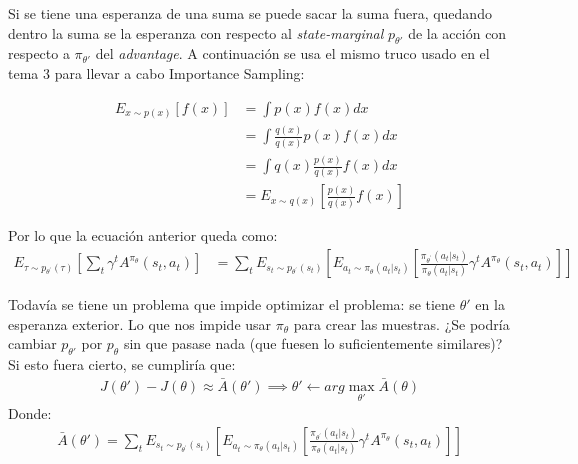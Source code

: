 Si se tiene una esperanza de una suma se puede sacar la suma fuera, quedando dentro la suma se la
esperanza con respecto al \textit{state-marginal} $p_{\theta'}$ de la acción con respecto a
$\pi_{\theta'}$ del \textit{advantage}. A continuación se usa el mismo truco usado en el tema 3
para llevar a cabo Importance Sampling:

\begin{align*}
    E_{x\sim p (x)}[f(x)] &= \int p(x)f(x)dx\\
                          &=\int \frac{q(x)}{q(x)} p(x)f(x)dx\\
                          &=\int q(x) \frac{p(x)}{q(x)} f(x)dx\\
                          &=E_{x\sim q(x)}\left[ \frac{p(x)}{q(x)} f(x)\right]
\end{align*}

Por lo que la ecuación anterior queda como:
\begin{align}
E _ { \tau \sim p _ { \theta ^ { \prime } } ( \tau ) } \left[ \sum _ { t } \gamma ^ { t } A ^ {
    \pi _ { \theta } } ( s _ { t } , a _ { t } ) \right] 
&= \sum _ { t } E _ { s _ { t } \sim p _ { \theta ^ { \prime } } ( s _ { t } ) } \left[ E _ { a _
    { t } \sim \pi _ { \theta } ( a _ { t } | s _ { t } ) } \left[ \frac { \pi _ { \theta ^ {
    \prime } } ( a _ { t } | s _ { t } ) } { \pi _ { \theta } ( a _ { t } | s _ { t } ) } \gamma
    ^ { t } A ^ { \pi _ { \theta } } ( s _ { t } , a _ { t } ) \right] \right]
\end{align}

Todavía se tiene un problema que impide optimizar el problema: se tiene $\theta'$ en la
esperanza exterior. Lo que nos impide usar $\pi_\theta$ para crear las muestras. ¿Se podría
cambiar  $p_{\theta'}$
por $p_{\theta}$ sin que pasase nada (que fuesen lo suficientemente similares)? Si esto
fuera cierto, se cumpliría que:
\begin{align}
    \label{eq:tema7loqueseintentademostrar}
    J(\theta') - J(\theta) \approx \bar{A}(\theta') \implies \theta'\gets
    arg\max_{\theta'} \bar{A}(\theta)
\end{align}
Donde:
\begin{align}
    \bar{A}(\theta') = 
\sum _ { t } E _ { s _ { t } \sim p _ { \theta ^ { \prime } } ( s _ { t } ) } \left[ E _ { a _
    { t } \sim \pi _ { \theta } ( a _ { t } | s _ { t } ) } \left[ \frac { \pi _ { \theta ^ {
    \prime } } ( a _ { t } | s _ { t } ) } { \pi _ { \theta } ( a _ { t } | s _ { t } ) } \gamma
    ^ { t } A ^ { \pi _ { \theta } } ( s _ { t } , a _ { t } ) \right] \right]
\end{align}

